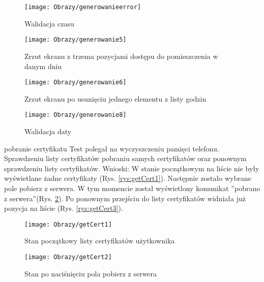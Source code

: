 \begin{enumerate*}
	


	\begin{figure}[ht!]
	
		\begin{minipage}{0.2\textwidth}
		\texttt{[image: Obrazy/generowanieerror]}
		\caption{Walidacja czasu }
		\label{rys:generowanie4}
	\end{minipage}
	
		\begin{minipage}{0.2\textwidth}
		\texttt{[image: Obrazy/generowanie5]}
		\caption{Zrzut ekranu z trzema pozycjami dostępu do pomieszczenia w danym dniu }
		\label{rys:generowanie5}
	\end{minipage}
	

	\begin{minipage}{0.2\textwidth}
		\texttt{[image: Obrazy/generowanie6]}
		\caption{Zrzut ekranu po usunięciu jednego elementu z listy godzin}
		\label{rys:generowanie6}
	\end{minipage}
	
	\begin{minipage}{0.2\textwidth}
		\texttt{[image: Obrazy/generowanie8]}
		\caption{Walidacja daty}
		\label{rys:generowanie7}
	\end{minipage}

\end{figure}
	
	
	\item   pobranie certyfikatu
	Test polegał na wyczyszczeniu pamięci telefonu. Sprawdzeniu listy certyfikatów pobraniu samych certyfikatów oraz ponownym sprawdzeniu listy certyfikatów.
	Wnioski: W stanie początkowym na liście nie były wyświetlane żadne certyfikaty (Rys. \ref{rys:getCert1}). Następnie zostało wybrane pole pobierz z serwera. W tym momencie został wyświetlony komunikat ''pobrano z serwera''(Rys. \ref{rys:getCert2}). Po ponownym przejściu do listy certyfikatów widniała już pozycja na liście (Rys. \ref{rys:getCert3}).
	
		\begin{figure}[ht!]
		
		\begin{minipage}{0.2\textwidth}
			\texttt{[image: Obrazy/getCert1]}
			\caption{Stan początkowy listy certyfikatów użytkownika }
			\label{rys:getCert1}
		\end{minipage}
		
		\begin{minipage}{0.2\textwidth}
			\texttt{[image: Obrazy/getCert2]}
			\caption{Stan po naciśnięciu pola pobierz z serwera }
			\label{rys:getCert2}
		\end{minipage}
		

\end{figure}
\end{enumerate*}
